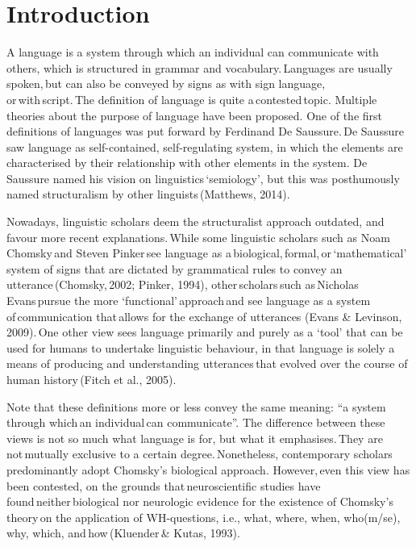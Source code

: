 \section{\setcounter{section}{-1}Introduction}

A language is a system through which an individual can communicate with others, which is structured in grammar and vocabulary. Languages are usually spoken, but can also be conveyed by signs as with sign language, or with script. The definition of language is quite a contested topic. Multiple theories about the purpose of language have been proposed. One of the first definitions of languages was put forward by Ferdinand De Saussure. De Saussure saw language as self-contained, self-regulating system, in which the elements are characterised by their relationship with other elements in the system. De Saussure named his vision on linguistics ‘semiology’, but this was posthumously named structuralism by other linguists (Matthews, 2014). 

Nowadays, linguistic scholars deem the structuralist approach outdated, and favour more recent explanations. While some linguistic scholars such as Noam Chomsky and Steven Pinker see language as a biological, formal, or ‘mathematical’ system of signs that are dictated by grammatical rules to convey an utterance (Chomsky, 2002; Pinker, 1994), other scholars such as Nicholas Evans pursue the more ‘functional’ approach and see language as a system of communication that allows for the exchange of utterances (Evans & Levinson, 2009). One other view sees language primarily and purely as a ‘tool’ that can be used for humans to undertake linguistic behaviour, in that language is solely a means of producing and understanding utterances that evolved over the course of human history (Fitch et al., 2005). 

Note that these definitions more or less convey the same meaning: “a system through which an individual can communicate”. The difference between these views is not so much what language is for, but what it emphasises. They are not mutually exclusive to a certain degree. Nonetheless, contemporary scholars predominantly adopt Chomsky's biological approach. However, even this view has been contested, on the grounds that neuroscientific studies have found neither biological nor neurologic evidence for the existence of Chomsky’s theory on the application of WH-questions, i.e., what, where, when, who(m/se), why, which, and how (Kluender & Kutas, 1993). 

